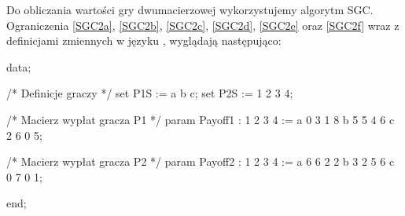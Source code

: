 \documentclass[polish]{standalone}
\begin{document}
Do obliczania wartości gry dwumacierzowej wykorzystujemy algorytm SGC. Ograniczenia \ref{SGC2a}, \ref{SGC2b},
\ref{SGC2c}, \ref{SGC2d}, \ref{SGC2e} oraz \ref{SGC2f} wraz z definicjami zmiennych w języku , wyglądają
następująco:

\begin{mathprog}[caption=Przykładowe dane]
data;

/* Definicje graczy */
set P1S := a b c;
set P2S := 1 2 3 4;

/* Macierz wypłat gracza P1 */
param Payoff1
    :  1  2  3  4 :=
    a  0  3  1  8
    b  5  5  4  6
    c  2  6  0  5;

/* Macierz wypłat gracza P2 */
param Payoff2
    :  1  2  3  4 :=
    a  6  6  2  2
    b  3  2  5  6
    c  0  7  0  1;
 
end;
\end{mathprog}
\end{document}
